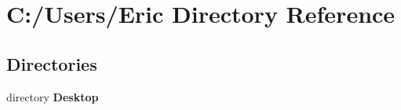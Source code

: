 \section{C\+:/\+Users/\+Eric Directory Reference}
\label{dir_bc2b495b0e4df4e04327641d0b1e06ea}
\subsection*{Directories}
\begin{DoxyCompactItemize}
\item 
directory {\bf Desktop}
\end{DoxyCompactItemize}

